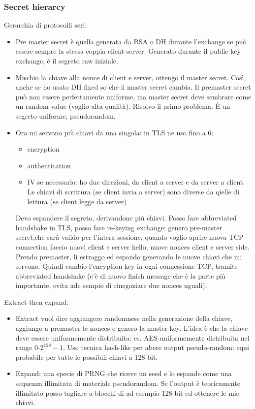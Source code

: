 \documentclass[16px]{article}
\begin{document}
\subsubsection{Secret hierarcy}
Gerarchia di protocolli seri:
\begin{itemize}
\item Pre master secret è quella generata da RSA o DH durante l'exchange se può essere sempre la stessa coppia client-server. Generato durante il public key exchange, è il segreto raw iniziale.
\item Mischio la chiave alla nonce di client e server, ottengo il master secret. Così, anche se ho usato DH fixed so che il master secret cambia. Il premaster secret può non essere perfettamente uniforme, ma master secret deve sembrare come un random value (voglio alta qualità). Risolvo il primo problema. È un segreto uniforme, pseudorandom.
\item Ora mi servono più chiavi da una singola: in TLS ne uso fino a 6:
\begin{itemize}
\item encryption
\item authentication
\item IV se necessario: ho due direzioni, da client a server e da server a client. Le chiavi di scrittura (se client invia a server) sono diverse da qielle di lettura (se client legge da server)
\end{itemize}
Devo espandere il segreto, derivandone più chiavi. Posso fare abbreviated handshake in TLS, posso fare re-keying exchange: genero pre-master secret,che sarà valido per l'intera sessione, quando voglio aprire nuova TCP connection faccio nuovi client e server hello, nuove nonces client e server side. Prendo premaster, li estraggo ed espando generando le nuove chiavi che mi servono. Quindi cambio l'encyption key in ogni connessione TCP, tramite abbreviated handshake (c'è di nuovo finish message che è la parte più importante, evita ade sempio di rinegoziare due nonces uguali).
\end{itemize}
Extract then expand:
\begin{itemize}
\item Extract vuol dire aggiungere randomness nella generazione della chiave, aggiungo a premaster le nonces e genero la master key. L'idea è che la chiave deve essere uniformemente distribuita: es. AES uniformemente distribuita nel range 0-$2^{128}-1$. Uso tecnica hash-like per abere output pseudo-random: equi probabile per tutte le possibili chiavi a 128 bit.
\item Expand: una specie di PRNG che riceve un seed e lo espande come una sequenza illimitata di materiale pseudorandom. Se l'output è teoricamente illimitato posso tagliare a blocchi di ad esempio 128 bit ed ottenere le mie chiavi.
\end{itemize}
\end{document}
